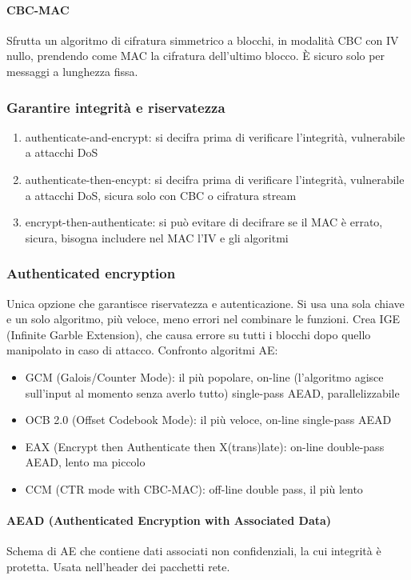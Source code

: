 \documentclass[11pt]{article}
\begin{document}
\paragraph*{CBC-MAC}
Sfrutta un algoritmo di cifratura simmetrico a blocchi, in modalità CBC con IV nullo, prendendo come MAC la cifratura 
dell'ultimo blocco. È sicuro solo per messaggi a lunghezza fissa.
\subsubsection{Garantire integrità e riservatezza}
\begin{enumerate}
    \item authenticate-and-encrypt: si decifra prima di verificare l'integrità, vulnerabile a attacchi DoS 
    \item authenticate-then-encypt: si decifra prima di verificare l'integrità, vulnerabile a attacchi DoS, sicura solo 
    con CBC o cifratura stream
    \item encrypt-then-authenticate: si può evitare di decifrare se il MAC è errato, sicura, bisogna includere nel MAC 
    l'IV e gli algoritmi
\end{enumerate}
\subsubsection{Authenticated encryption}
Unica opzione che garantisce riservatezza e autenticazione. Si usa una sola chiave e un solo algoritmo, più veloce, meno 
errori nel combinare le funzioni. Crea IGE (Infinite Garble Extension), che causa errore su tutti i blocchi dopo quello 
manipolato in caso di attacco.
Confronto algoritmi AE:
\begin{itemize}
    \item GCM (Galois/Counter Mode): il più popolare, on-line (l'algoritmo agisce sull'input al momento senza averlo tutto)
    single-pass AEAD, parallelizzabile
    \item OCB 2.0 (Offset Codebook Mode): il più veloce, on-line single-pass AEAD
    \item EAX (Encrypt then Authenticate then X(trans)late): on-line double-pass AEAD, lento ma piccolo
    \item CCM (CTR mode with CBC-MAC): off-line double pass, il più lento
\end{itemize}
\paragraph*{AEAD (Authenticated Encryption with Associated Data)}
Schema di AE che contiene dati associati non confidenziali, la cui integrità è protetta. Usata nell'header dei pacchetti rete.
\end{document}
